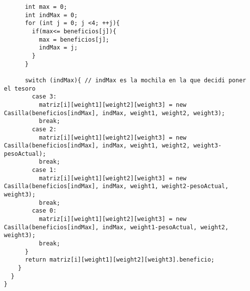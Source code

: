 \begin{lstlisting}
      int max = 0;
      int indMax = 0;
      for (int j = 0; j <4; ++j){
        if(max<= beneficios[j]){
          max = beneficios[j];
          indMax = j;
        }
      }	

      switch (indMax){ // indMax es la mochila en la que decidi poner el tesoro
        case 3:
          matriz[i][weight1][weight2][weight3] = new Casilla(beneficios[indMax], indMax, weight1, weight2, weight3);
          break;
        case 2:
          matriz[i][weight1][weight2][weight3] = new Casilla(beneficios[indMax], indMax, weight1, weight2, weight3-pesoActual);
          break;
        case 1:
          matriz[i][weight1][weight2][weight3] = new Casilla(beneficios[indMax], indMax, weight1, weight2-pesoActual, weight3);
          break;
        case 0:
          matriz[i][weight1][weight2][weight3] = new Casilla(beneficios[indMax], indMax, weight1-pesoActual, weight2, weight3);
          break;
      }
      return matriz[i][weight1][weight2][weight3].beneficio;
    }
  }
}
	\end{lstlisting}